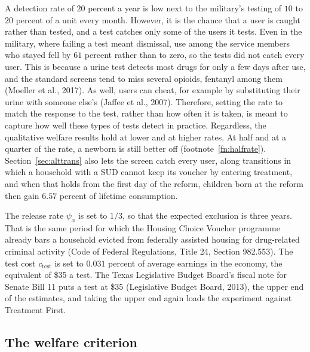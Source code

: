 \documentclass[10pt]{article}
\begin{document}
A detection rate of $20$ percent a year is low next to the military's testing of $10$ to $20$ percent of a unit every month. However, it is the chance that a user is caught rather than tested, and a test catches only some of the users it tests. Even in the military, where failing a test meant dismissal, use among the service members who stayed fell by $61$ percent rather than to zero, so the tests did not catch every user.  This is because a urine test detects most drugs for only a few days after use, and the standard  screens tend to miss several opioids, fentanyl among them (Moeller et al., 2017). As well,  users can cheat, for example by substituting their urine with someone else's  (Jaffee et al., 2007).  Therefore, setting the rate to match the response to the test, rather than how often it is taken,  is meant to capture how well these types of tests detect in practice.  Regardless, the qualitative welfare results hold at lower and at higher rates. At half and at a quarter of the rate, a newborn is still better off (footnote~\ref{fn:halfrate}). Section~\ref{sec:alttrans} also lets the screen catch every user,  along transitions in which a household with a SUD cannot keep its voucher by entering treatment, and when that holds from the first day of the reform, children born at the reform then gain $6.57$ percent of lifetime consumption.   

The release rate $\psi_x$ is set to $1/3$, so that the expected
exclusion is three years. That is the same period for which the Housing Choice Voucher programme
already bars a household evicted from federally assisted housing for drug-related criminal
activity (Code of Federal Regulations, Title 24, Section 982.553). The test cost $c_{\mathrm{test}}$ is set to $0.031$ percent of average earnings in the economy, the equivalent of
\$35 a test. The Texas Legislative Budget Board's fiscal note for Senate Bill 11 puts a test at \$35 (Legislative Budget Board, 2013), the upper end of the estimates, and taking the upper end again loads the experiment against Treatment First.

\subsection{The welfare criterion}\label{sec:cev}
\end{document}
